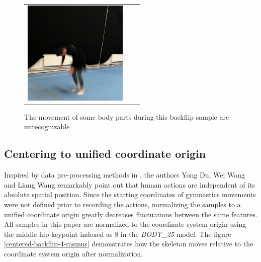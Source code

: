 \begin{figure}
\begin{tabular}{ccc}
\includegraphics[width=5cm]{images/data-preprocessing/unrec-backflip-part-6}\\
\end{tabular}
    \caption{The movement of some body parts during this backflip sample are unrecognizable}
    \label{example-of-unrecognizable-backflip}
\end{figure}

\subsection{Centering to unified coordinate origin}

Inspired by data pre-processing methods in \cite{hierarchical-rnn-har}, the authors Yong Du, Wei Wang and Liang Wang remarkably point out that human actions are independent of its absolute spatial position. Since the starting coordinates of gymnastics movements were not defined prior to recording the actions, normalizing the samples to a unified coordinate origin greatly decreases fluctuations between the same features. All samples in this paper are normalized to the coordinate system origin using the middle hip keypoint indexed as 8 in the \textit{BODY\_25} model. The figure \ref{centered-backflip-4-rasmus} demonstrates how the skeleton moves relative to the coordinate system origin after normalization.

